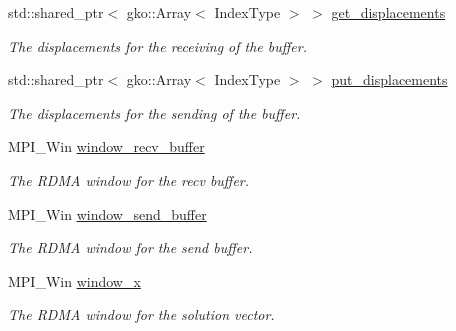 \begin{DoxyCompactItemize}
\mbox{\label{structschwz_1_1Communicate_1_1comm__struct_aa9d510fb291e896fa14fe3e0f00f0454}} 
std\+::shared\+\_\+ptr$<$ gko\+::\+Array$<$ Index\+Type $>$ $>$ \hyperlink{structschwz_1_1Communicate_1_1comm__struct_aa9d510fb291e896fa14fe3e0f00f0454}{get\+\_\+displacements}
\begin{DoxyCompactList}\small\item\em The displacements for the receiving of the buffer. \end{DoxyCompactList}\item 
\mbox{\label{structschwz_1_1Communicate_1_1comm__struct_abb06062ad6fddb9d0399625f4d799d08}} 
std\+::shared\+\_\+ptr$<$ gko\+::\+Array$<$ Index\+Type $>$ $>$ \hyperlink{structschwz_1_1Communicate_1_1comm__struct_abb06062ad6fddb9d0399625f4d799d08}{put\+\_\+displacements}
\begin{DoxyCompactList}\small\item\em The displacements for the sending of the buffer. \end{DoxyCompactList}\item 
\mbox{\label{structschwz_1_1Communicate_1_1comm__struct_a6257c71a7ebf30ecfc390059ceef0e1f}} 
M\+P\+I\+\_\+\+Win \hyperlink{structschwz_1_1Communicate_1_1comm__struct_a6257c71a7ebf30ecfc390059ceef0e1f}{window\+\_\+recv\+\_\+buffer}
\begin{DoxyCompactList}\small\item\em The R\+D\+MA window for the recv buffer. \end{DoxyCompactList}\item 
\mbox{\label{structschwz_1_1Communicate_1_1comm__struct_af2c5d4bfea8073b2c885eec175b92416}} 
M\+P\+I\+\_\+\+Win \hyperlink{structschwz_1_1Communicate_1_1comm__struct_af2c5d4bfea8073b2c885eec175b92416}{window\+\_\+send\+\_\+buffer}
\begin{DoxyCompactList}\small\item\em The R\+D\+MA window for the send buffer. \end{DoxyCompactList}\item 
\mbox{\label{structschwz_1_1Communicate_1_1comm__struct_a5da0c24baf9d9955d764fe4b3274a982}} 
M\+P\+I\+\_\+\+Win \hyperlink{structschwz_1_1Communicate_1_1comm__struct_a5da0c24baf9d9955d764fe4b3274a982}{window\+\_\+x}
\begin{DoxyCompactList}\small\item\em The R\+D\+MA window for the solution vector. \end{DoxyCompactList}\end{DoxyCompactItemize}


